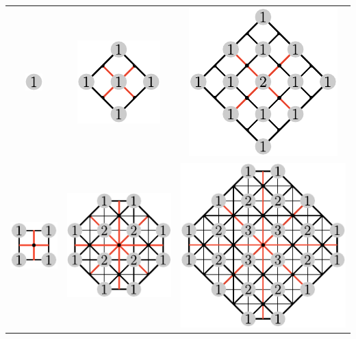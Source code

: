 \documentclass[11pt,oneside]{article}
\begin{document}
\begin{center}
\begin{tabular}{ c c c }
  \includegraphics[scale=0.7]{images/so5_weights_00.pdf}
& \includegraphics[scale=0.7]{images/so5_weights_01.pdf}
& \includegraphics[scale=0.7]{images/so5_weights_02.pdf} \\
  \includegraphics[scale=0.7]{images/so5_weights_10.pdf}
& \includegraphics[scale=0.7]{images/so5_weights_11.pdf}
& \includegraphics[scale=0.7]{images/so5_weights_12.pdf} \\

\end{tabular}
\end{center}
\end{document}
